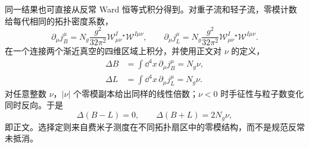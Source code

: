\begin{derivation}[电弱拓扑跃迁与重子轻子数选择定则]
同一结果也可直接从反常 Ward 恒等式积分得到。对重子流和轻子流，零模计数给每代相同的拓扑密度系数，
\begin{equation*}
 \partial_\mu j_B^\mu
 =N_g\frac{g^2}{32\pi^2}
 \mathcal W_{\mu\nu}^I{}^\star\!\mathcal W^{I\mu\nu},
 \qquad
 \partial_\mu j_L^\mu
 =N_g\frac{g^2}{32\pi^2}
 \mathcal W_{\mu\nu}^I{}^\star\!\mathcal W^{I\mu\nu}.
\end{equation*}
在一个连接两个渐近真空的四维区域上积分，并使用正文对 $\nu$ 的定义，
\begin{align*}
 \Delta B
 &=\int\dd^4x\,\partial_\mu j_B^\mu
 =N_g\nu,\\
 \Delta L
 &=\int\dd^4x\,\partial_\mu j_L^\mu
 =N_g\nu.
\end{align*}
对任意整数 $\nu$，$|\nu|$ 个零模副本给出同样的线性倍数；$\nu<0$ 时手征性与粒子数变化同时反向。于是
\begin{equation*}
 \Delta(B-L)=0,
 \qquad
 \Delta(B+L)=2N_g\nu,
\end{equation*}
即正文。选择定则来自费米子测度在不同拓扑扇区中的零模结构，而不是规范反常未抵消。
\end{derivation}

